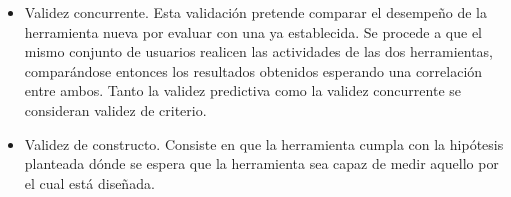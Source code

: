 \begin{itemize}
\item Validez concurrente.
    Esta validación pretende comparar el desempeño de la herramienta nueva por evaluar con una ya establecida. Se procede a que el mismo conjunto de usuarios realicen las actividades de las dos herramientas, comparándose entonces los resultados obtenidos esperando una correlación entre ambos. Tanto la validez predictiva como la validez concurrente se consideran validez de criterio.
    

    \item Validez de constructo.
    Consiste en que la herramienta cumpla con la hipótesis planteada dónde se espera que la herramienta sea capaz de medir aquello por el cual está diseñada. 
    





    
    
\end{itemize}









